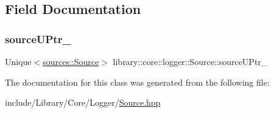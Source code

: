 \subsection{Field Documentation}
\mbox{\label{classlibrary_1_1core_1_1logger_1_1Source_a9461165d5d581171a044200b58007a3a}} 
\subsubsection{\texorpdfstring{source\+U\+Ptr\+\_\+}{sourceUPtr\_}}
{\footnotesize\ttfamily Unique$<$\hyperlink{classlibrary_1_1core_1_1logger_1_1sources_1_1Source}{sources\+::\+Source}$>$ library\+::core\+::logger\+::\+Source\+::source\+U\+Ptr\+\_\+}



The documentation for this class was generated from the following file\+:\begin{DoxyCompactItemize}
\item 
include/\+Library/\+Core/\+Logger/\hyperlink{Source_8hpp}{Source.\+hpp}\end{DoxyCompactItemize}
